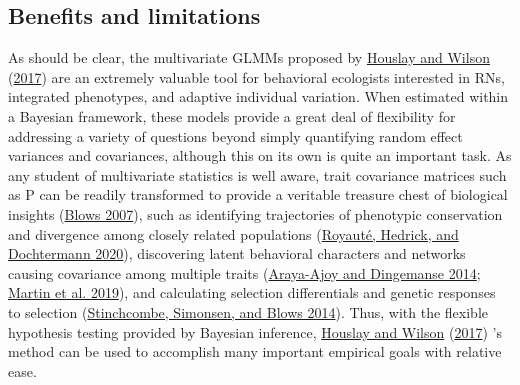 \documentclass{article}
\begin{document}
\hypertarget{benefits-and-limitations}{%
\subsection{Benefits and limitations}\label{benefits-and-limitations}}

As should be clear, the multivariate GLMMs proposed by
\protect\hyperlink{ref-Hous2017}{Houslay and Wilson}
(\protect\hyperlink{ref-Hous2017}{2017}) are an extremely valuable tool
for behavioral ecologists interested in RNs, integrated phenotypes, and
adaptive individual variation. When estimated within a Bayesian
framework, these models provide a great deal of flexibility for
addressing a variety of questions beyond simply quantifying random
effect variances and covariances, although this on its own is quite an
important task. As any student of multivariate statistics is well aware,
trait covariance matrices such as \(\boldsymbol{\mathrm{P}}\) can be
readily transformed to provide a veritable treasure chest of biological
insights (\protect\hyperlink{ref-Blows2007}{Blows 2007}), such as
identifying trajectories of phenotypic conservation and divergence among
closely related populations (\protect\hyperlink{ref-Roy2020}{Royauté,
Hedrick, and Dochtermann 2020}), discovering latent behavioral
characters and networks causing covariance among multiple traits
(\protect\hyperlink{ref-Araya2014}{Araya-Ajoy and Dingemanse 2014};
\protect\hyperlink{ref-Martin2019}{Martin et al. 2019}), and calculating
selection differentials and genetic responses to selection
(\protect\hyperlink{ref-Stinch2014}{Stinchcombe, Simonsen, and Blows
2014}). Thus, with the flexible hypothesis testing provided by Bayesian
inference, \protect\hyperlink{ref-Hous2017}{Houslay and Wilson}
(\protect\hyperlink{ref-Hous2017}{2017}) 's method can be used to
accomplish many important empirical goals with relative ease.
\end{document}
